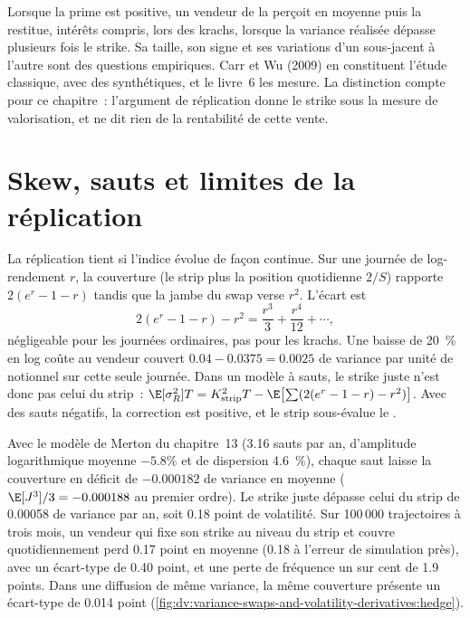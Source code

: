 Lorsque la prime est positive, un vendeur de  la perçoit en moyenne puis la restitue, intérêts compris,
lors des krachs, lorsque la variance réalisée dépasse plusieurs fois le strike. Sa taille, son signe et ses variations d'un sous-jacent à l'autre
sont des questions empiriques. Carr et Wu (2009) en constituent l'étude classique, avec des 
synthétiques, et le livre~6 les mesure. La distinction compte pour ce chapitre~: l'argument de réplication
donne le strike sous la mesure de valorisation, et ne dit rien de la rentabilité de cette vente.

\section{Skew, sauts et limites de la réplication}

La réplication tient si l'indice évolue de façon continue. Sur une journée de log-rendement $r$, la couverture (le strip
plus la position quotidienne $2/S$) rapporte $2(e^r-1-r)$ tandis que la jambe du swap verse $r^2$. L'écart est
\[
2(e^r-1-r)-r^2=\frac{r^3}3+\frac{r^4}{12}+\cdots,
\]
négligeable pour les journées ordinaires, pas pour les krachs. Une baisse de 20~\% en log coûte au vendeur couvert
$0.04-0.0375=0.0025$ de variance par unité de notionnel sur cette seule journée. Dans un modèle à sauts, le strike juste
n'est donc pas celui du strip~: $\E[\sigma_R^2]T=K_{\mathrm{strip}}^2T-\E\bigl[\sum(2(e^r-1-r)-r^2)\bigr]$. Avec des sauts
négatifs, la correction est positive, et le strip sous-évalue le .

\begin{example}\label{ex:dv:variance-swaps-and-volatility-derivatives:jumps}
Avec le modèle de Merton du chapitre~13 (3.16 sauts par an, d'amplitude logarithmique moyenne $-5.8\%$ et de dispersion 4.6~\%), chaque saut
laisse la couverture en déficit de $-0.000182$ de variance en moyenne ($\E[J^3]/3=-0.000188$ au premier ordre). Le strike
juste dépasse celui du strip de 0.00058 de variance par an, soit 0.18 point de volatilité. Sur 100\,000 trajectoires à trois mois,
un vendeur qui fixe son strike au niveau du strip et couvre quotidiennement perd 0.17 point en moyenne (0.18 à l'erreur de simulation près), avec un écart-type de 0.40
point, et une perte de fréquence un sur cent de 1.9 points. Dans une diffusion de même variance, la même couverture présente un
écart-type de 0.014 point (\cref{fig:dv:variance-swaps-and-volatility-derivatives:hedge}).
\end{example}

